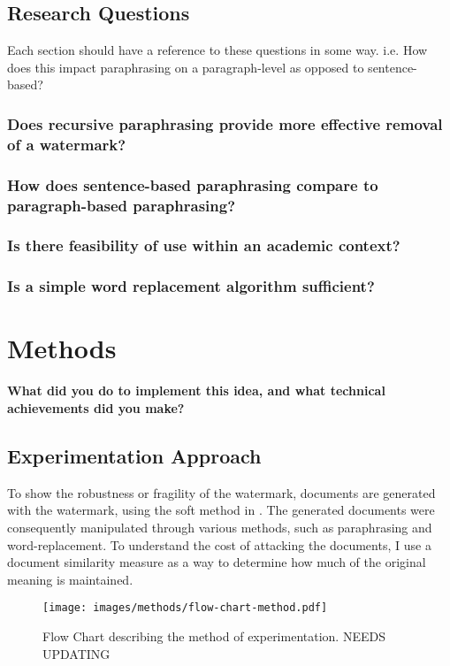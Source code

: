 \documentclass{l4proj}
\theoremstyle{definition}
\begin{document}
\section{Research Questions}
    Each section should have a reference to these questions in some way. i.e. How does this impact paraphrasing on a paragraph-level as opposed to sentence-based? 
    \subsection{Does recursive paraphrasing provide more effective removal of a watermark?}
    \subsection{How does sentence-based paraphrasing compare to paragraph-based paraphrasing?}
    \subsection{Is there feasibility of use within an academic context?}
    \subsection{Is a simple word replacement algorithm sufficient?}
    
    
\chapter{Methods}
\textbf{What did you do to implement this idea, and what technical achievements did you make?}

\section{Experimentation Approach}
    To show the robustness or fragility of the watermark, documents are generated with the watermark, using the soft method in \citet{kirchenbauer2023watermark}. The generated documents were consequently manipulated through various methods, such as paraphrasing and word-replacement. To understand the cost of attacking the documents, I use a document similarity measure as a way to determine how much of the original meaning is maintained.

    \begin{figure}[h]
        \centering
        \texttt{[image: images/methods/flow-chart-method.pdf]}
        \caption{Flow Chart describing the method of experimentation. NEEDS UPDATING}
        \label{fig:method-flow-chart} 
    \end{figure}
\end{document}
